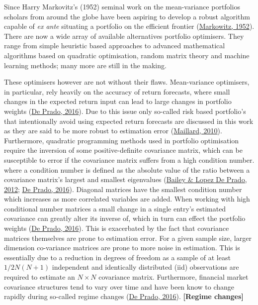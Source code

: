 \documentclass[11pt,preprint, authoryear]{elsarticle}
\numberwithin{equation}{section}
\numberwithin{figure}{section}
\numberwithin{table}{section}
\begin{document}
Since Harry Markovitz's (1952) seminal work on the mean-variance
portfolios scholars from around the globe have been aspiring to develop
a robust algorithm capable of \emph{ex ante} situating a portfolio on
the efficient frontier (\protect\hyperlink{ref-markowitz}{Markowitz,
1952}). There are now a wide array of available alternatives portfolio
optimisers. They range from simple heuristic based approaches to
advanced mathematical algorithms based on quadratic optimisation, random
matrix theory and machine learning methods; many more are still in the
making.

These optimisers however are not without their flaws. Mean-variance
optimisers, in particular, rely heavily on the accuracy of return
forecasts, where small changes in the expected return input can lead to
large changes in portfolio weights (\protect\hyperlink{ref-lopez}{De
Prado, 2016}). Due to this issue only so-called risk based portfolio's
that intentionally avoid using expected return forecasts are discussed
in this work as they are said to be more robust to estimation error
(\protect\hyperlink{ref-maillard2010}{Maillard, 2010}). Furthermore,
quadratic programming methods used in portfolio optimisation require the
inversion of some positive-definite covariance matrix, which can be
susceptible to error if the covariance matrix suffers from a high
condition number. where a condition number is defined as the absolute
value of the ratio between a covariance matrix's largest and smallest
eigenvalues (\protect\hyperlink{ref-lopez2012}{Bailey \& Lopez De Prado,
2012}; \protect\hyperlink{ref-lopez}{De Prado, 2016}). Diagonal matrices
have the smallest condition number which increases as more correlated
variables are added. When working with high conditional number matrices
a small change in a single entry's estimated covariance can greatly
alter its inverse of, which in turn can effect the portfolio weights
(\protect\hyperlink{ref-lopez}{De Prado, 2016}). This is exacerbated by
the fact that covariance matrices themselves are prone to estimation
error. For a given sample size, larger dimension co-variance matrices
are prone to more noise in estimation. This is essentially due to a
reduction in degrees of freedom as a sample of at least \(1/2N(N+1)\)
independent and identically distributed (iid) observations are required
to estimate an \(N\times N\) covariance matrix. Furthermore, financial
market covariance structures tend to vary over time and have been know
to change rapidly during so-called regime changes
(\protect\hyperlink{ref-lopez}{De Prado, 2016}). \textbf{{[}Regime
changes{]}}
\end{document}
